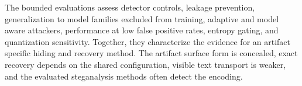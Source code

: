 \documentclass[fleqn,10pt]{wlscirep}
\begin{document}
The bounded evaluations assess detector controls, leakage prevention, generalization to model families excluded from training, adaptive and model aware attackers, performance at low false positive rates, entropy gating, and quantization sensitivity. Together, they characterize the evidence for an artifact specific hiding and recovery method. The artifact surface form is concealed, exact recovery depends on the shared configuration, visible text transport is weaker, and the evaluated steganalysis methods often detect the encoding.




\end{document}
